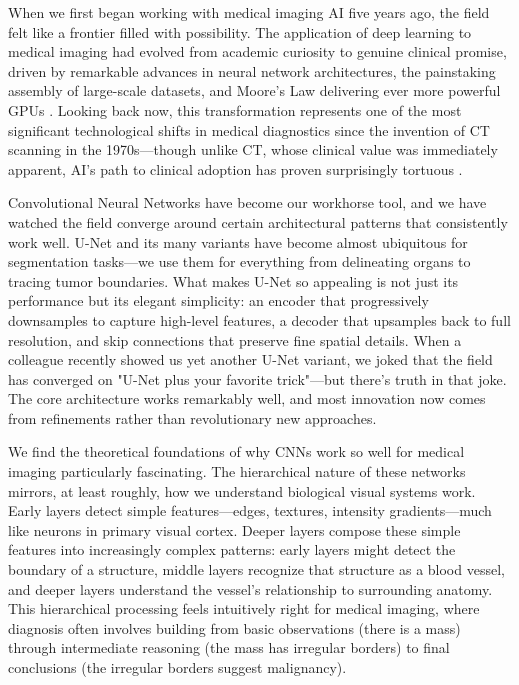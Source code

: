 \documentclass[12pt,a4paper]{article}
\begin{document}
When we first began working with medical imaging AI five years ago, the field felt like a frontier filled with possibility. The application of deep learning to medical imaging had evolved from academic curiosity to genuine clinical promise, driven by remarkable advances in neural network architectures, the painstaking assembly of large-scale datasets, and Moore's Law delivering ever more powerful GPUs \cite{litjens2017survey}. Looking back now, this transformation represents one of the most significant technological shifts in medical diagnostics since the invention of CT scanning in the 1970s—though unlike CT, whose clinical value was immediately apparent, AI's path to clinical adoption has proven surprisingly tortuous \cite{topol2019high}.

Convolutional Neural Networks have become our workhorse tool, and we have watched the field converge around certain architectural patterns that consistently work well. U-Net \cite{ronneberger2015unet} and its many variants have become almost ubiquitous for segmentation tasks—we use them for everything from delineating organs to tracing tumor boundaries. What makes U-Net so appealing is not just its performance but its elegant simplicity: an encoder that progressively downsamples to capture high-level features, a decoder that upsamples back to full resolution, and skip connections that preserve fine spatial details. When a colleague recently showed us yet another U-Net variant, we joked that the field has converged on "U-Net plus your favorite trick"—but there's truth in that joke. The core architecture works remarkably well, and most innovation now comes from refinements rather than revolutionary new approaches.

We find the theoretical foundations of why CNNs work so well for medical imaging particularly fascinating. The hierarchical nature of these networks mirrors, at least roughly, how we understand biological visual systems work. Early layers detect simple features—edges, textures, intensity gradients—much like neurons in primary visual cortex. Deeper layers compose these simple features into increasingly complex patterns: early layers might detect the boundary of a structure, middle layers recognize that structure as a blood vessel, and deeper layers understand the vessel's relationship to surrounding anatomy. This hierarchical processing feels intuitively right for medical imaging, where diagnosis often involves building from basic observations (there is a mass) through intermediate reasoning (the mass has irregular borders) to final conclusions (the irregular borders suggest malignancy).
\end{document}
